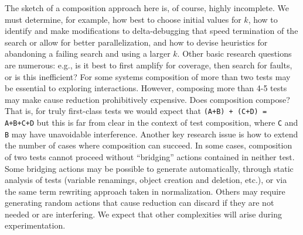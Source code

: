 
The sketch of a composition approach here is, of course, highly
incomplete. We must determine, for example, how best to choose initial
values for $k$, how to identify and make modifications to
delta-debugging that speed termination of the search or allow for
better parallelization, and how to devise heuristics for abandoning a
failing search and using a larger $k$.  Other basic research questions
are numerous: e.g., is it best to first amplify for coverage, then
search for faults, or is this inefficient? For some systems composition
of more than two tests may be essential to exploring interactions.
However, composing more than 4-5 tests may make cause reduction
prohibitively expensive.  Does composition compose?  That is, for
truly first-class tests we would expect that {\tt (A+B) + (C+D) =
  A+B+C+D} but this is far from clear in the context of test
composition, where {\tt C} and {\tt B} may have unavoidable
interference.  Another key research issue is how to extend the number
of cases where composition can succeed.  In some cases, composition of
two tests cannot proceed without ``bridging'' actions contained in
neither test.  Some bridging actions may be possible to generate
automatically, through static analysis of tests (variable renamings,
object creation and deletion, etc.), or via the same term rewriting
approach taken in normalization.  Others may require generating
random actions that cause reduction can discard if they are not needed
or are interfering.  We expect that other complexities will arise
during experimentation.


